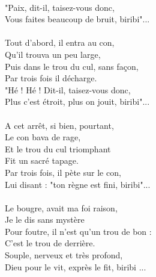 \\"Paix, dit-il, taisez-vous donc,
\\Vous faites beaucoup de bruit, biribi"...
\\\\Tout d’abord, il entra au con,
\\Qu’il trouva un peu large,
\\Puis dans le trou du cul, sans façon,
\\Par trois fois il décharge.
\\"Hé ! Hé ! Dit-il, taisez-vous donc,
\\Plus c’est étroit, plus on jouit, biribi"...
\\\\A cet arrêt, si bien, pourtant,
\\Le con bava de rage,
\\Et le trou du cul triomphant
\\Fit un sacré tapage.
\\Par trois fois, il pète sur le con,
\\Lui disant : "ton règne est fini, biribi"...
\\\\Le bougre, avait ma foi raison,
\\Je le dis sans mystère
\\Pour foutre, il n’est qu’un trou de bon :
\\C’est le trou de derrière.
\\Souple, nerveux et très profond,
\\Dieu pour le vit, exprès le fit, biribi ...

\breakpage
